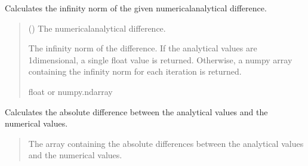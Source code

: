 \documentclass[a4paper,11pt,english,openany]{sphinxmanual}
\begin{document}
\begin{fulllineitems}
\begin{fulllineitems}
\label{\detokenize{api/spyice.utils.error_norms:src.spyice.utils.error_norms.ErrorNorms.infinity_norm}}
\pysigstartsignatures
\pysiglinewithargsret
{}
{}
{}
\pysigstopsignatures
\sphinxAtStartPar
Calculates the infinity norm of the given numerical\sphinxhyphen{}analytical difference.
\begin{quote}\begin{description}
\sphinxAtStartPar
{} () \textendash{} The numerical\sphinxhyphen{}analytical difference.

\sphinxAtStartPar
The infinity norm of the difference. If the analytical values
are 1\sphinxhyphen{}dimensional, a single float value is returned. Otherwise, a numpy array
containing the infinity norm for each iteration is returned.

\sphinxAtStartPar
float or numpy.ndarray

\end{description}\end{quote}

\end{fulllineitems}


\begin{fulllineitems}
\label{\detokenize{api/spyice.utils.error_norms:src.spyice.utils.error_norms.ErrorNorms.numerical_analytical_diff}}
\pysigstartsignatures
\pysiglinewithargsret
{}
{}
{}
\pysigstopsignatures
\sphinxAtStartPar
Calculates the absolute difference between the analytical values and the numerical values.
\begin{quote}\begin{description}
\sphinxAtStartPar
{}

\sphinxAtStartPar
The array containing the absolute differences between the analytical values and the numerical values.


\end{description}
\end{quote}
\end{fulllineitems}
\end{fulllineitems}
\end{document}
